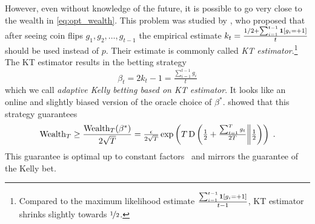 However, even without knowledge of the future, it is possible to go very close
to the wealth in \eqref{eq:opt_wealth}.  This problem was studied by
\citet{Krichevsky-Trofimov-1981}, who proposed that after seeing coin flips
$g_1, g_2, \dots, g_{t-1}$ the empirical estimate $k_t = \frac{1/2 +
\sum_{i=1}^{t-1} \mathbf{1}[g_i = +1]}{t}$ should be used instead of $p$. Their
estimate is commonly called \emph{KT estimator}.\footnote{Compared to the
maximum likelihood estimate $\frac{\sum_{i=1}^{t-1} \mathbf{1}[g_i =
+1]}{t-1}$, KT estimator shrinks slightly towards $\nicefrac{1}{2}$.} The KT
estimator results in the betting strategy
\begin{equation}
\label{equation:kt-estimator-betting-strategy}
\beta_t = 2k_t - 1 = \tfrac{\sum_{i=1}^{t-1} g_i}{t}
\end{equation}
which we call \emph{adaptive Kelly betting based on KT estimator}. It looks like
an online and slightly biased version of the oracle choice of $\beta^*$.
\citeauthor{Krichevsky-Trofimov-1981} showed that this strategy guarantees
\[
\operatorname{Wealth}_T \ge \frac{\operatorname{Wealth}_T(\beta^*)}{2\sqrt{T}}
= \tfrac{\epsilon}{2\sqrt{T}} \exp\left(T \operatorname{D}\left({\tfrac{1}{2}+\tfrac{\sum_{t=1}^T g_t}{2T}}\middle\|{\tfrac{1}{2}}\right)\right)\; .
\]
This guarantee is optimal up to constant
factors~\citep{Cesa-Bianchi-Lugosi-2006} and mirrors the guarantee of the Kelly
bet.

